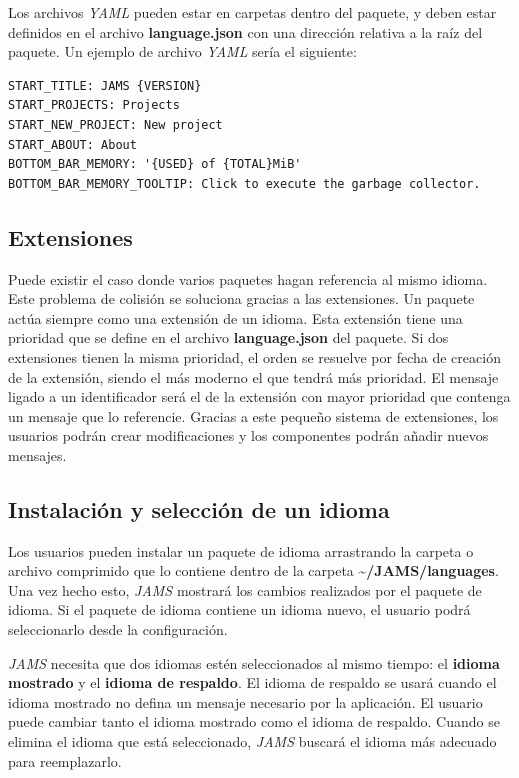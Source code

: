 Los archivos \textit{YAML} pueden estar en carpetas dentro del paquete,
y deben estar definidos en el archivo \textbf{language.json} con una
dirección relativa a la raíz del paquete.
Un ejemplo de archivo \textit{YAML} sería el siguiente:

\begin{lstlisting}[frame=single,label={lst:interface.yml}]
START_TITLE: JAMS {VERSION}
START_PROJECTS: Projects
START_NEW_PROJECT: New project
START_ABOUT: About
BOTTOM_BAR_MEMORY: '{USED} of {TOTAL}MiB'
BOTTOM_BAR_MEMORY_TOOLTIP: Click to execute the garbage collector.
\end{lstlisting}

\subsection{Extensiones}\label{subsec:idiomas-extensiones}

Puede existir el caso donde varios paquetes hagan referencia al mismo idioma.
Este problema de colisión se soluciona gracias a las extensiones.
Un paquete actúa siempre como una extensión de un idioma.
Esta extensión tiene una prioridad que se define en el archivo
\textbf{language.json} del paquete.
Si dos extensiones tienen la misma prioridad, el orden se resuelve
por fecha de creación de la extensión, siendo el más moderno
el que tendrá más prioridad.
El mensaje ligado a un identificador será el de la extensión con mayor prioridad
que contenga un mensaje que lo referencie.
Gracias a este pequeño sistema de extensiones, los usuarios podrán crear modificaciones
y los componentes podrán añadir nuevos mensajes.

\subsection{Instalación y selección de un idioma}\label{subsec:instalacion-y-seleccion-de-un-idioma}

Los usuarios pueden instalar un paquete de idioma arrastrando la carpeta o
archivo comprimido que lo contiene dentro de la carpeta \textbf{\textasciitilde/JAMS/languages}.
Una vez hecho esto, \textit{JAMS} mostrará los cambios realizados por el paquete
de idioma.
Si el paquete de idioma contiene un idioma nuevo, el usuario podrá seleccionarlo
desde la configuración.

\textit{JAMS} necesita que dos idiomas estén seleccionados al mismo tiempo:
el \textbf{idioma mostrado} y el \textbf{idioma de respaldo}.
El idioma de respaldo se usará cuando el idioma mostrado no defina un mensaje
necesario por la aplicación.
El usuario puede cambiar tanto el idioma mostrado como el idioma de respaldo.
Cuando se elimina el idioma que está seleccionado, \textit{JAMS}
buscará el idioma más adecuado para reemplazarlo.

